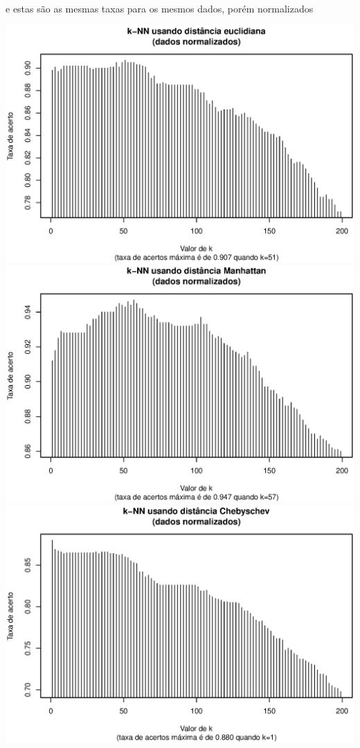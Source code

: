 \documentclass[10pt,a4paper,twocolumn]{article}
\begin{document}
      e estas são as mesmas taxas para os mesmos dados, porém normalizados
      
      \includegraphics[scale=0.33]{graficos/euclidiana_1.ps}
      \includegraphics[scale=0.33]{graficos/manhattan_1.ps}
      \includegraphics[scale=0.33]{graficos/chebyschev_1.ps}
\end{document}
